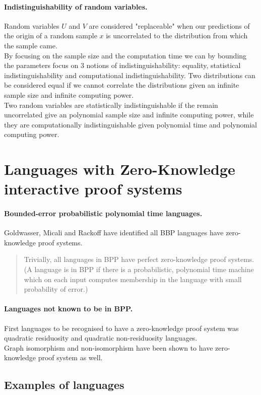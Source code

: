 \documentclass[12pt,a4paper]{article}
\begin{document}
\paragraph{Indistinguishability of random variables.}
Random variables $U$ and $V$ are considered "replaceable" when our predictions of the origin of a random sample $x$ is uncorrelated to the distribution from which the sample came.\\
By focusing on the sample size and the computation time we can by bounding the parameters focus on 3 notions of indistinguishability: equality, statistical indistinguishability and computational indistinguishability.
Two distributions can be considered equal if we cannot correlate the distributions given an infinite sample size and infinite computing power.\\
Two random variables are statistically indistinguishable if the remain uncorrelated give an polynomial sample size and infinite computing power, while they are computationally indistinguishable given polynomial time and polynomial computing power.


\section{Languages with Zero-Knowledge interactive proof systems}
\paragraph{Bounded-error probabilistic polynomial time languages.}
Goldwasser, Micali and Rackoff \cite{GMR} have identified all BBP languages have zero-knowledge proof systems.
\begin{quote}
	Trivially, all languages in BPP have perfect zero-knowledge proof systems. (A language is in BPP if there is a probabilistic, polynomial time machine which on each input computes membership in the language with small probability of error.)
\end{quote}
\paragraph{Languages not known to be in BPP.}
First languages to be recognised to have a zero-knowledge proof system was quadratic residuosity and quadratic non-residuosity languages.\\
Graph isomorphism and non-isomorphism have been shown to have zero-knowledge proof system as well.


\subsection{Examples of languages}
\end{document}
